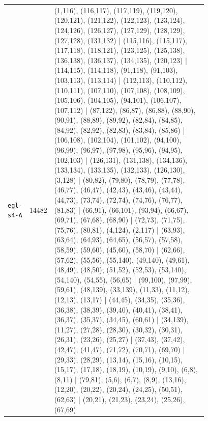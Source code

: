 \begin{landscape}
\begin{longtable}{lr>{\tiny\raggedright\arraybackslash}p{0.78\linewidth}}
\texttt{egl-s4-A} & 14482 & (1,116), (116,117), (117,119), (119,120), (120,121), (121,122), (122,123), (123,124), (124,126), (126,127), (127,129), (128,129), (127,128), (131,132) | (115,116), (115,117), (117,118), (118,121), (123,125), (125,138), (136,138), (136,137), (134,135), (120,123) | (114,115), (114,118), (91,118), (91,103), (103,113), (113,114) | (112,113), (110,112), (110,111), (107,110), (107,108), (108,109), (105,106), (104,105), (94,101), (106,107), (107,112) | (87,122), (86,87), (86,88), (88,90), (90,91), (88,89), (89,92), (82,84), (84,85), (84,92), (82,92), (82,83), (83,84), (85,86) | (106,108), (102,104), (101,102), (94,100), (96,99), (96,97), (97,98), (95,96), (94,95), (102,103) | (126,131), (131,138), (134,136), (133,134), (133,135), (132,133), (126,130), (3,128) | (80,82), (79,80), (78,79), (77,78), (46,77), (46,47), (42,43), (43,46), (43,44), (44,73), (73,74), (72,74), (74,76), (76,77), (81,83) | (66,91), (66,101), (93,94), (66,67), (69,71), (67,68), (68,90) | (72,73), (71,75), (75,76), (80,81), (4,124), (2,117) | (63,93), (63,64), (64,93), (64,65), (56,57), (57,58), (58,59), (59,60), (45,60), (58,70) | (62,66), (57,62), (55,56), (55,140), (49,140), (49,61), (48,49), (48,50), (51,52), (52,53), (53,140), (54,140), (54,55), (56,65) | (99,100), (97,99), (59,61), (48,139), (33,139), (11,33), (11,12), (12,13), (13,17) | (44,45), (34,35), (35,36), (36,38), (38,39), (39,40), (40,41), (38,41), (36,37), (35,37), (34,45), (60,61) | (34,139), (11,27), (27,28), (28,30), (30,32), (30,31), (26,31), (23,26), (25,27) | (37,43), (37,42), (42,47), (41,47), (71,72), (70,71), (69,70) | (29,33), (28,29), (13,14), (15,16), (10,15), (15,17), (17,18), (18,19), (10,19), (9,10), (6,8), (8,11) | (79,81), (5,6), (6,7), (8,9), (13,16), (12,20), (20,22), (20,24), (24,25), (50,51), (62,63) | (20,21), (21,23), (23,24), (25,26), (67,69) \\[2pt]

\end{longtable}
\end{landscape}
